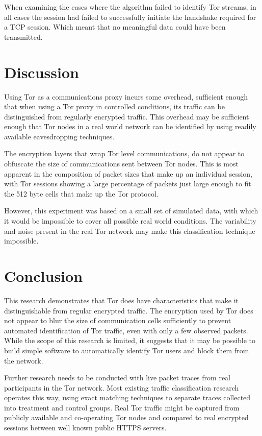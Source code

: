 \documentclass[conference]{IEEEtran}
\begin{document}
When examining the cases where the algorithm failed to identify Tor streams, in
all cases the session had failed to successfully initiate the handshake
required for a TCP session. Which meant that no meaningful data could have been
transmitted.

\section{Discussion}

Using Tor as a communications proxy incurs some overhead, sufficient enough
that when using a Tor proxy in controlled conditions, its traffic can be
distinguished from regularly encrypted traffic. This overhead may be sufficient
enough that Tor nodes in a real world network can be identified by using
readily available eavesdropping techniques.

The encryption layers that wrap Tor level communications, do not
appear to obfuscate the size of communications sent between Tor nodes. This is
most apparent in the composition of packet sizes that make up an individual
session, with Tor sessions showing a large percentage of packets just large
enough to fit the 512 byte cells that make up the Tor protocol.

However, this experiment was based on a small set of simulated data, with which
it would be impossible to cover all possible real world conditions. The
variability and noise present in the real Tor network may make this
classification technique impossible.


\section{Conclusion}

This research demonstrates that Tor does have characteristics that make it
distinguishable from regular encrypted traffic. The encryption used by Tor does
not appear to blur the size of communication cells sufficiently to prevent
automated identification of Tor traffic, even with only a few observed packets.
While the scope of this research is limited, it suggests that it may be
possible to build simple software to automatically identify Tor users and block
them from the network.

Further research needs to be conducted with live packet traces from real
participants in the Tor network. Most existing traffic classification research
operates this way, using exact matching techniques to separate traces collected
into treatment and control groups. Real Tor traffic might be captured from
publicly available and co-operating Tor nodes and compared to real encrypted
sessions between well known public HTTPS servers.
\end{document}
